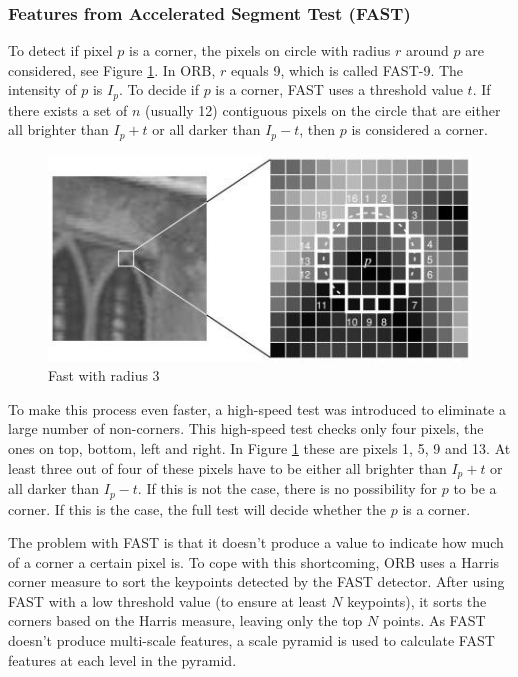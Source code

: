 \subsubsection{Features from Accelerated Segment Test (FAST)}
To detect if pixel $p$ is a corner, the pixels on circle with radius $r$ around $p$ are considered, see Figure \ref{fig:fastcircle}. In ORB, $r$ equals 9, which is called FAST-9. The intensity of $p$ is $I_p$. To decide if $p$ is a corner, FAST uses a threshold value $t$. If there exists a set of $n$ (usually 12) contiguous pixels on the circle that are either all brighter than $I_p + t$ or all darker than $I_p - t$, then $p$ is considered a corner.\bigskip

\begin{figure}
    \centering
    \includegraphics[width=1\textwidth]{figures/fast_circle.jpg}
    \caption{Fast with radius 3}
    \label{fig:fastcircle}
\end{figure}

To make this process even faster, a high-speed test was introduced to eliminate a large number of non-corners. This high-speed test checks only four pixels, the ones on top, bottom, left and right. In Figure \ref{fig:fastcircle} these are pixels 1, 5, 9 and 13. At least three out of four of these pixels have to be either all brighter than $I_p + t$ or all darker than $I_p - t$. If this is not the case, there is no possibility for $p$ to be a corner. If this is the case, the full test will decide whether the $p$ is a corner.\bigskip

The problem with FAST is that it doesn't produce a value to indicate how much of a corner a certain pixel is. To cope with this shortcoming, ORB uses a Harris corner measure \cite{Harris1988ACC} to sort the keypoints detected by the FAST detector. After using FAST with a low threshold value (to ensure at least $N$ keypoints), it sorts the corners based on the Harris measure, leaving only the top $N$ points. As FAST doesn't produce multi-scale features, a scale pyramid is used to calculate FAST features at each level in the pyramid.

